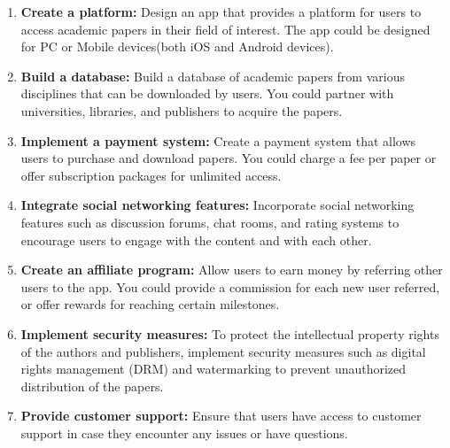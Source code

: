 \documentclass[lettersize,journal]{IEEEtran}
\begin{document}
\begin{enumerate}
  \item \textbf{Create a platform:} Design an app that provides a platform for users to access academic papers in their field of interest. The app could be designed for PC or Mobile devices(both iOS and Android devices).
  \item \textbf{Build a database:} Build a database of academic papers from various disciplines that can be downloaded by users. You could partner with universities, libraries, and publishers to acquire the papers.
  \item \textbf{Implement a payment system:} Create a payment system that allows users to purchase and download papers. You could charge a fee per paper or offer subscription packages for unlimited access.
  \item \textbf{Integrate social networking features:} Incorporate social networking features such as discussion forums, chat rooms, and rating systems to encourage users to engage with the content and with each other.
  \item \textbf{Create an affiliate program:} Allow users to earn money by referring other users to the app. You could provide a commission for each new user referred, or offer rewards for reaching certain milestones.
  \item \textbf{Implement security measures:} To protect the intellectual property rights of the authors and publishers, implement security measures such as digital rights management (DRM) and watermarking to prevent unauthorized distribution of the papers.
  \item \textbf{Provide customer support:} Ensure that users have access to customer support in case they encounter any issues or have questions. 
\end{enumerate}
\end{document}
